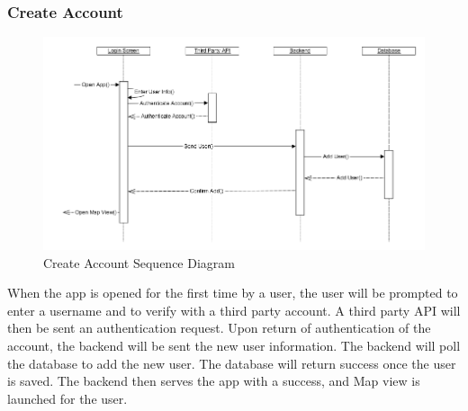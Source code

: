         \subsubsection{Create Account}
            \begin{figure}[H]
                \centering
                \includegraphics[width=\textwidth]{src/img/create-account.png}
                \caption{Create Account Sequence Diagram} 
            \end{figure}

            When the app is opened for the first time by a user, the user will
            be prompted to enter a username and to verify with a third party
            account. A third party API will then be sent an authentication
            request. Upon return of authentication of the account, the backend
            will be sent the new user information. The backend will poll the
            database to add the new user. The database will return success once
            the user is saved. The backend then serves the app with a success,
            and Map view is launched for the user.
